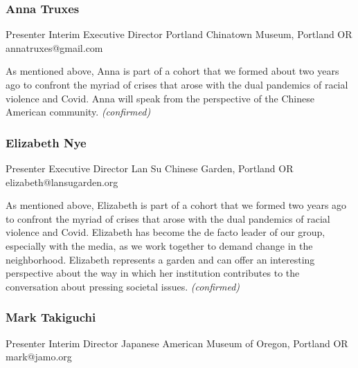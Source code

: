 \documentclass{report}
\begin{document}
              
                \subsubsection*{ Anna  Truxes }
                Presenter\newline
                Interim Executive Director\newline
                Portland Chinatown Museum, Portland OR
                \newline
                annatruxes@gmail.com\newline
                
                

                As mentioned above, Anna is part of a cohort that we formed about two years ago to confront the myriad of crises that arose with the dual pandemics of racial violence and Covid. Anna will speak from the perspective of the Chinese American community.
                \emph{ (confirmed) }
              

              
                \subsubsection*{ Elizabeth  Nye }
                Presenter\newline
                Executive Director\newline
                Lan Su Chinese Garden, Portland OR
                \newline
                elizabeth@lansugarden.org\newline
                
                

                As mentioned above, Elizabeth is part of a cohort that we formed two years ago to confront the myriad of crises that arose with the dual pandemics of racial violence and Covid. Elizabeth has become the de facto leader of our group, especially with the media, as we work together to demand change in the neighborhood. Elizabeth represents a garden and can offer an interesting perspective about the way in which her institution contributes to the conversation about pressing societal issues.
                \emph{ (confirmed) }
              

              
                \subsubsection*{ Mark Takiguchi }
                Presenter\newline
                Interim Director\newline
                Japanese American Museum of Oregon, Portland OR
                \newline
                mark@jamo.org\newline
                
\end{document}
